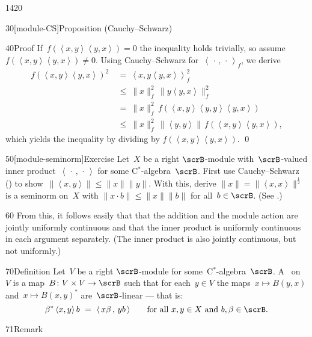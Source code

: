 \begin{parsec}{1420}
\begin{point}{30}[module-CS]{Proposition (Cauchy--Schwarz)}
\begin{point}{40}{Proof}
If~$f(\left<x,y\right>\left<y,x\right>) = 0$
the inequality holds trivially,
so assume~$f(\left<x,y\right>\left<y,x\right>) \neq 0$.
Using Cauchy--Schwarz for~$\left<\,\cdot\,,\,\cdot\,\right>_f$,
    we derive
\begin{align*}
    f(\left<x,y\right>\left<y,x\right>)^2
        &\  =\  \left<x,y\left<y,x\right>\right>_f^2 \\
        &\  \leq\  \|x\|_f^2 \, \|y \left<y,x\right>\|_f^2 \\
    & \ =\  \|x\|_f^2\, f(\left<x,y\right>\left<y,y\right>\left<y,x\right>)\\
    & \ \leq\  \|x\|_f^2 \,
    \|\left<y,y\right>\| \,
    f(\left<x,y\right>\left<y,x\right>),
\end{align*}
    which yields the inequality by dividing by
$f(\left<x,y\right>\left<y,x\right>)$. \qed
\end{point}
\end{point}
\begin{point}{50}[module-seminorm]{Exercise}
Let~$X$ be a right $\scrB$-module
    with~$\scrB$-valued inner product~$\left<\,\cdot\,,\,\cdot\,\right>$
    for some C$^*$-algebra~$\scrB$.
First use Cauchy--Schwarz ()
    to show~$\|\left<x,y\right>\| \leq \|x\|\|y\|$.
With this, derive $\|x\| =\|\left<x,x\right>\|^{\frac{1}{2}}$ is a seminorm on~$X$ with
    $\|x \cdot b \| \leq \|x\|\|b\|$
    for all~$b \in \scrB$.
    (See \cite[prop.~2.3]{paschke}.)
\begin{point}{60}%
From this, it follows easily that
that the addition and the module action
are jointly uniformly continuous
    and that the inner product is uniformly continuous in each argument
    separately.
(The inner product is also jointly continuous,
    but not uniformly.)
\end{point}
\end{point}
\begin{point}{70}{Definition}%
Let~$V$ be a right $\scrB$-module for some~C$^*$-algebra~$\scrB$.
A~ on~$V$
    is a map~$B\colon V\times V \to \scrB$
    such that for each~$y\in V$
    the maps~$x \mapsto B(y, x)$
        and~$x \mapsto B(x,y)^*$ are~$\scrB$-linear --- that is:
\begin{equation*}
\beta^* \,\langle x,y\rangle \,b \ =\ \langle \,x \beta\,,\, y b \,\rangle 
    \qquad \text{for all $x,y \in X$ and~$b,\beta \in \scrB$}.
\end{equation*}
\spacingfix{}
\begin{point}{71}{Remark}%

\end{point}
\end{point}
\end{parsec}
